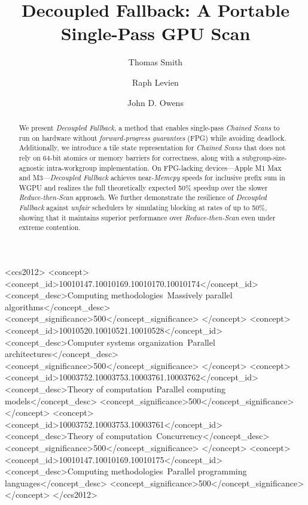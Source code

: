 \documentclass[acmsmall, manuscript, screen, review, anonymous]{acmart}
\begin{document}
\title{Decoupled Fallback: A Portable Single-Pass GPU Scan}

\author{Thomas Smith}

\author{Raph Levien}

\author{John D. Owens}

\renewcommand{\shortauthors}{Smith et al.}

\begin{abstract}
  We present \emph{Decoupled Fallback}, a method that enables single-pass \emph{Chained Scans} to run on hardware without \emph{forward-progress guarantees} (FPG) while avoiding deadlock. Additionally, we introduce a tile state representation for \emph{Chained Scans} that does not rely on 64-bit atomics or memory barriers for correctness, along with a subgroup-size-agnostic intra-workgroup implementation. On FPG-lacking devices---Apple M1 Max and M3---\emph{Decoupled Fallback} achieves near-\emph{Memcpy} speeds for inclusive prefix sum in WGPU and realizes the full theoretically expected 50\% speedup over the slower \emph{Reduce-then-Scan} approach. We further demonstrate the resilience of \emph{Decoupled Fallback} against \emph{unfair} schedulers by simulating blocking at rates of up to 50\%, showing that it maintains superior performance over \emph{Reduce-then-Scan} even under extreme contention.
\end{abstract}

\begin{CCSXML}
  <ccs2012>
  <concept>
  <concept_id>10010147.10010169.10010170.10010174</concept_id>
  <concept_desc>Computing methodologies~Massively parallel algorithms</concept_desc>
  <concept_significance>500</concept_significance>
  </concept>
  <concept>
  <concept_id>10010520.10010521.10010528</concept_id>
  <concept_desc>Computer systems organization~Parallel architectures</concept_desc>
  <concept_significance>500</concept_significance>
  </concept>
  <concept>
  <concept_id>10003752.10003753.10003761.10003762</concept_id>
  <concept_desc>Theory of computation~Parallel computing models</concept_desc>
  <concept_significance>500</concept_significance>
  </concept>
  <concept>
  <concept_id>10003752.10003753.10003761</concept_id>
  <concept_desc>Theory of computation~Concurrency</concept_desc>
  <concept_significance>500</concept_significance>
  </concept>
  <concept>
  <concept_id>10010147.10010169.10010175</concept_id>
  <concept_desc>Computing methodologies~Parallel programming languages</concept_desc>
  <concept_significance>500</concept_significance>
  </concept>
  </ccs2012>
\end{CCSXML}
\end{document}
